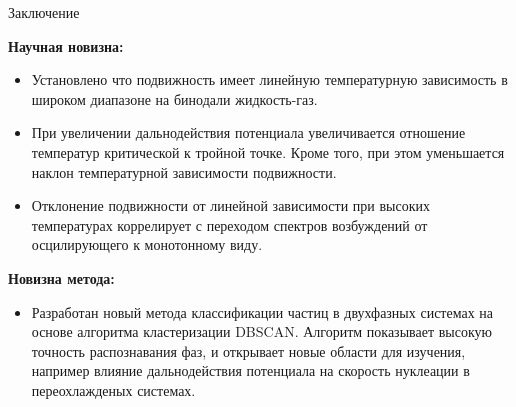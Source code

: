 \documentclass{beamer}
\begin{document}
\begin{frame}{Заключение}
\footnotesize{

\textbf{Научная новизна:}

\begin{itemize}

    \item Установлено что подвижность имеет линейную температурную зависимость в широком диапазоне на бинодали жидкость-газ.

    \item При увеличении дальнодействия потенциала увеличивается отношение температур критической к тройной точке. Кроме того, при этом уменьшается наклон температурной зависимости подвижности.

    \item Отклонение подвижности от линейной зависимости при высоких температурах коррелирует с переходом спектров возбуждений от осцилирующего к монотонному виду.

\end{itemize}

\textbf{Новизна метода:}

\begin{itemize}

    \item Разработан новый метода классификации частиц в двухфазных системах на основе алгоритма кластеризации DBSCAN. Алгоритм показывает высокую точность распознавания фаз, и открывает новые области для изучения, например влияние дальнодействия потенциала на скорость нуклеации в переохлажденых системах.

\end{itemize}


}
\end{frame}
\end{document}
